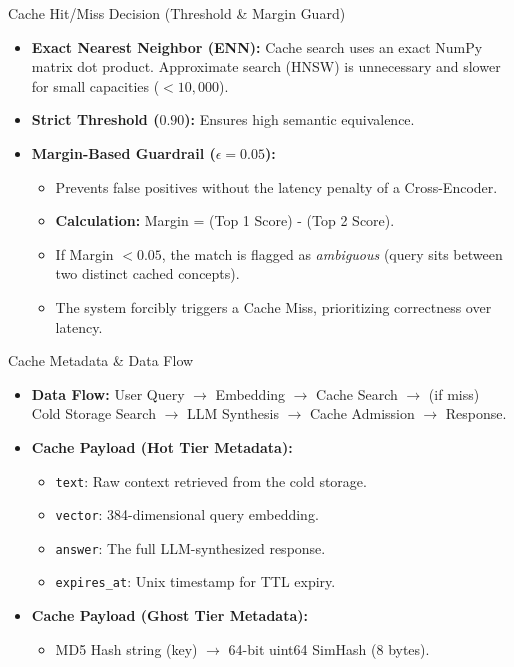 \documentclass[aspectratio=169]{beamer}
\begin{document}
\begin{frame}{Cache Hit/Miss Decision (Threshold \& Margin Guard)}
    \begin{itemize}
        \item \textbf{Exact Nearest Neighbor (ENN):} Cache search uses an exact NumPy matrix dot product. Approximate search (HNSW) is unnecessary and slower for small capacities ($<10,000$).
        \item \textbf{Strict Threshold ($0.90$):} Ensures high semantic equivalence.
        \item \textbf{Margin-Based Guardrail ($\epsilon = 0.05$):}
        \begin{itemize}
            \item Prevents false positives without the latency penalty of a Cross-Encoder.
            \item \textbf{Calculation:} Margin = (Top 1 Score) - (Top 2 Score).
            \item If Margin $< 0.05$, the match is flagged as \textit{ambiguous} (query sits between two distinct cached concepts).
            \item The system forcibly triggers a Cache Miss, prioritizing correctness over latency.
        \end{itemize}
    \end{itemize}
\end{frame}

\begin{frame}{Cache Metadata \& Data Flow}
    \begin{itemize}
        \item \textbf{Data Flow:} User Query $\rightarrow$ Embedding $\rightarrow$ Cache Search $\rightarrow$ (if miss) Cold Storage Search $\rightarrow$ LLM Synthesis $\rightarrow$ Cache Admission $\rightarrow$ Response.
        \item \textbf{Cache Payload (Hot Tier Metadata):}
        \begin{itemize}
            \item \texttt{text}: Raw context retrieved from the cold storage.
            \item \texttt{vector}: 384-dimensional query embedding.
            \item \texttt{answer}: The full LLM-synthesized response.
            \item \texttt{expires\_at}: Unix timestamp for TTL expiry.
        \end{itemize}
        \item \textbf{Cache Payload (Ghost Tier Metadata):}
        \begin{itemize}
            \item MD5 Hash string (key) $\rightarrow$ 64-bit uint64 SimHash (8 bytes).
        \end{itemize}
    \end{itemize}
\end{frame}
\end{document}
